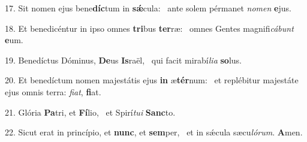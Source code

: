 17. Sit nomen ejus bene\textbf{díc}tum in \textbf{sǽ}cula: \ast\  ante solem pérmanet \textit{no}\textit{men} \textbf{e}jus.\

18. Et benedicéntur in ipso omnes \textbf{tri}bus \textbf{ter}ræ: \ast\  omnes Gentes magnifi\textit{cá}\textit{bunt} \textbf{e}um.\

19. Benedíctus Dóminus, \textbf{De}us \textbf{Is}raël, \ast\  qui facit mirabí\textit{li}\textit{a} \textbf{so}lus.\

20. Et benedíctum nomen majestátis ejus \textbf{in} æ\textbf{tér}num: \ast\  et replébitur majestáte ejus omnis terra: \textit{fi}\textit{at}, \textbf{fi}at.\

21. Glória \textbf{Pa}tri, et \textbf{Fí}lio, \ast\  et Spirí\textit{tu}\textit{i} \textbf{Sanc}to.\

22. Sicut erat in princípio, et \textbf{nunc}, et \textbf{sem}per, \ast\  et in sǽcula sæcu\textit{ló}\textit{rum}. \textbf{A}men.\

